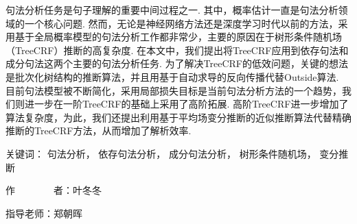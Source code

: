 
\begin{cabstract}
	句法分析任务是句子理解的重要中间过程之一.
	其中，概率估计一直是句法分析领域的一个核心问题.
	然而，无论是神经网络方法还是深度学习时代以前的方法，采用基于全局概率模型的句法分析工作都非常少，主要的原因在于树形条件随机场（TreeCRF）推断的高复杂度.
	在本文中，我们提出将TreeCRF应用到依存句法和成分句法这两个主要的句法分析任务.
	为了解决TreeCRF的低效问题，关键的想法是批次化树结构的推断算法，并且用基于自动求导的反向传播代替Outside算法.
	目前句法模型被不断简化，采用局部损失目标是当前句法分析方法的一个趋势，我们则进一步在一阶TreeCRF的基础上采用了高阶拓展.
	高阶TreeCRF进一步增加了算法复杂度，为此，我们还提出利用基于平均场变分推断的近似推断算法代替精确推断的TreeCRF方法，从而增加了解析效率.
	
	\vskip 21bp
	\noindent
	{\heiti{} 关键词：}
	句法分析，
	依存句法分析，
	成分句法分析，
	树形条件随机场，
	变分推断
	
	\begin{flushright}
		作~~~~~~~~者：叶冬冬
		
		指导老师：郑朝晖
		
	\end{flushright}
\end{cabstract}


